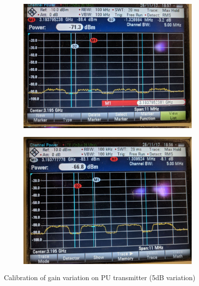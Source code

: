 \begin{figure}[!htb]
    \centering
    \begin{subfigure}[htb]{0.45\textwidth}
        \centering
        \includegraphics[width=\linewidth]{figures/snr_spec_5}
    \end{subfigure}
    \begin{subfigure}[htb]{0.45\textwidth}
        \centering
        \includegraphics[width=\linewidth]{figures/snr_spec_10}
    \end{subfigure}
    \caption{Calibration of gain variation on PU transmitter (5dB variation)}
    \label{fig:snr_spec}
\end{figure}

